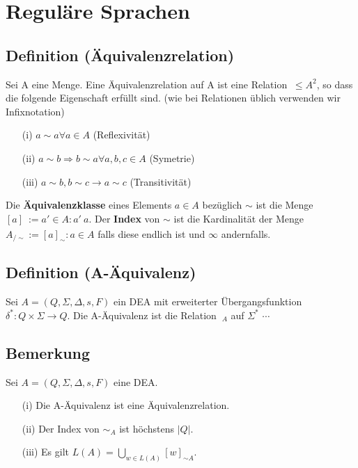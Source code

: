 \section{Reguläre Sprachen}
\subsection{Definition (Äquivalenzrelation)} Sei A eine Menge. Eine Äquivalenzrelation auf A ist eine Relation $~ \leq A^{2}$, so dass die folgende Eigenschaft erfüllt sind. (wie bei Relationen üblich verwenden wir Infixnotation)
\begin{itemize}
    \item [(i)] $a \sim a \forall a \in A $ (Reflexivität)
    \item [(ii)] $a \sim b \Rightarrow  b \sim a \forall a, b, c \in A$ (Symetrie)
    \item [(iii)] $a \sim b, b \sim c \rightarrow a \sim c$ (Transitivität)
\end{itemize}
Die \textbf{Äquivalenzklasse} eines Elements $a \in A$ bezüglich $\sim$ ist die Menge $[a]_{~} := {a' \in A : a' ~a}$. Der \textbf{Index} von $\sim$ ist die Kardinalität der Menge $A_{/\sim} := {[a]_{\sim} : a \in A}$ falls diese endlich ist und $\infty$  andernfalls.

\subsection{Definition (A-Äquivalenz)} Sei $A = (Q, \Sigma, \Delta, s, F)$ ein DEA mit erweiterter Übergangsfunktion 
$\delta^{*}: Q \times \Sigma \rightarrow Q$. Die A-Äquivalenz ist die Relation $~_A$ auf $\Sigma^{*}$
$\cdots$

\subsection{Bemerkung} Sei $A = (Q, \Sigma, \Delta, s, F)$ eine DEA.
\begin{itemize}
    \item [(i)] Die A-Äquivalenz ist eine Äquivalenzrelation.
    \item [(ii)] Der Index von $\sim_{A}$ ist höchstens $|Q|$.
    \item [(iii)] Es gilt $L(A) = \bigcup \limits_{w \in L(A)} [w]_{\sim A}$.
\end{itemize}

